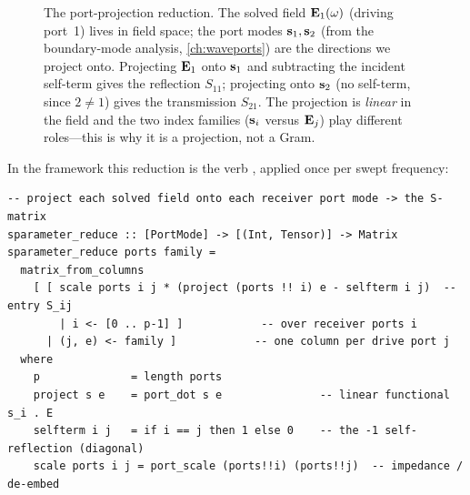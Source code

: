 \begin{figure}[t]
\centering
{}
\caption[The port projection]{The port-projection reduction. The solved field
$\mathbf{E}_1(\omega)$ (driving port~1) lives in field space; the port modes $\mathbf{s}_1,\mathbf{s}_2$
(from the boundary-mode analysis, \cref{ch:waveports}) are the directions we
project onto. Projecting $\mathbf{E}_1$ onto $\mathbf{s}_1$ and subtracting the incident
self-term gives the reflection $S_{11}$; projecting onto $\mathbf{s}_2$ (no self-term,
since $2\neq1$) gives the transmission $S_{21}$. The projection is \emph{linear}
in the field and the two index families ($\mathbf{s}_i$ versus $\mathbf{E}_j$) play different
roles---this is why it is a projection, not a Gram.}
\label{fig:proj}
\end{figure}

In the framework this reduction is the verb , applied once
per swept frequency:
\begin{lstlisting}[style=l4style]
-- project each solved field onto each receiver port mode -> the S-matrix
sparameter_reduce :: [PortMode] -> [(Int, Tensor)] -> Matrix
sparameter_reduce ports family =
  matrix_from_columns
    [ [ scale ports i j * (project (ports !! i) e - selfterm i j)  -- entry S_ij
        | i <- [0 .. p-1] ]            -- over receiver ports i
      | (j, e) <- family ]            -- one column per drive port j
  where
    p              = length ports
    project s e    = port_dot s e               -- linear functional  s_i . E
    selfterm i j   = if i == j then 1 else 0    -- the -1 self-reflection (diagonal)
    scale ports i j = port_scale (ports!!i) (ports!!j)  -- impedance / de-embed
\end{lstlisting}

